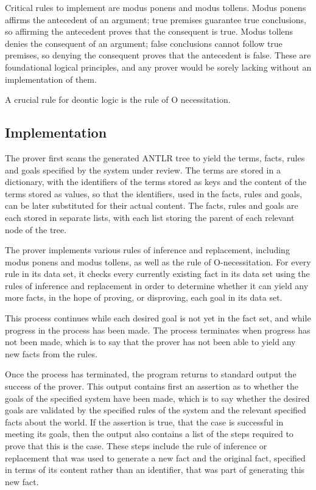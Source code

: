 \documentclass{l4proj}
\begin{document}
Critical rules to implement are modus ponens and modus tollens. Modus ponens affirms the antecedent of an argument; true premises guarantee true conclusions, so affirming the antecedent proves that the consequent is true. Modus tollens denies the consequent of an argument; false conclusions cannot follow true premises, so denying the consequent proves that the antecedent is false. These are foundational logical principles, and any prover would be sorely lacking without an implementation of them. 

A crucial rule for deontic logic is the rule of O necessitation. 


\subsection{Implementation}
The prover first scans the generated ANTLR tree to yield the terms, facts, rules and goals specified by the system under review. The terms are stored in a dictionary, with the identifiers of the terms stored as keys and the content of the terms stored as values, so that the identifiers, used in the facts, rules and goals, can be later substituted for their actual content. The facts, rules and goals are each stored in separate lists, with each list storing the parent of each relevant node of the tree. 

The prover implements various rules of inference and replacement, including modus ponens and modus tollens, as well as the rule of O-necessitation. For every rule in its data set, it checks every currently existing fact in its data set using the rules of inference and replacement in order to determine whether it can yield any more facts, in the hope of proving, or disproving, each goal in its data set. 

This process continues while each desired goal is not yet in the fact set, and while progress in the process has been made. The process terminates when progress has not been made, which is to say that the prover has not been able to yield any new facts from the rules. 

Once the process has terminated, the program returns to standard output the success of the prover. This output contains first an assertion as to whether the goals of the specified system have been made, which is to say whether the desired goals are validated by the specified rules of the system and the relevant specified facts about the world. If the assertion is true, that the case is successful in meeting its goals, then the output also contains a list of the steps required to prove that this is the case. These steps include the rule of inference or replacement that was used to generate a new fact and the original fact, specified in terms of its content rather than an identifier, that was part of generating this new fact. 
\end{document}

